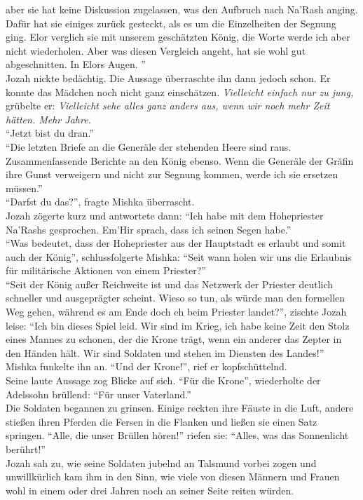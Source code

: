 aber sie hat keine Diskussion zugelassen, was den Aufbruch nach Na'Rash anging. Dafür hat sie 
einiges zurück gesteckt, als es um die Einzelheiten der Segnung ging. Elor verglich sie mit unserem 
geschätzten König, die Worte werde ich aber nicht wiederholen. Aber was diesen Vergleich angeht, 
hat sie wohl gut abgeschnitten. In Elors Augen. ''\\
Jozah nickte bedächtig. Die Aussage überraschte ihn dann jedoch schon. Er konnte das Mädchen noch 
nicht ganz einschätzen. \textit{Vielleicht einfach nur zu jung,} grübelte er: \textit{Vielleicht 
sehe alles ganz anders aus, wenn wir noch mehr Zeit hätten. Mehr Jahre.}\\
``Jetzt bist du dran.''\\
``Die letzten Briefe an die Generäle der stehenden Heere sind raus. Zusammenfassende Berichte an 
den König ebenso. Wenn die Generäle der Gräfin ihre Gunst verweigern und nicht zur Segnung kommen, 
werde ich sie ersetzen müssen.''\\
``Darfst du das?'', fragte Mishka überrascht.\\
Jozah zögerte kurz und antwortete dann: ``Ich habe mit dem Hohepriester Na'Rashs gesprochen. Em'Hir 
sprach, dass ich seinen Segen habe.''\\
``Was bedeutet, dass der Hohepriester aus der Hauptstadt es erlaubt und somit auch der König'', 
schlussfolgerte Mishka: ``Seit wann holen wir uns die Erlaubnis für militärische Aktionen von einem 
Priester?''\\
``Seit der König außer Reichweite ist und das Netzwerk der Priester deutlich schneller und 
ausgeprägter scheint. Wieso so tun, als würde man den formellen Weg gehen, während es am Ende doch 
eh beim Priester landet?'', zischte Jozah leise: ``Ich bin dieses Spiel leid. Wir sind im Krieg, 
ich habe keine Zeit den Stolz eines Mannes zu schonen, der die Krone trägt, wenn ein anderer das 
Zepter in den Händen hält. Wir sind Soldaten und stehen im Diensten des Landes!''\\
Mishka funkelte ihn an. ``Und der Krone!'', rief er kopfschüttelnd.\\
Seine laute Aussage zog Blicke auf sich. ``Für die Krone'', wiederholte der Adelssohn brüllend: 
``Für unser Vaterland.''\\
Die Soldaten begannen zu grinsen. Einige reckten ihre Fäuste in die Luft, andere stießen ihren 
Pferden die Fersen in die Flanken und ließen sie einen Satz springen. ``Alle, die 
unser Brüllen hören!'' riefen sie: ``Alles, was das Sonnenlicht berührt!''\\
Jozah sah zu, wie seine Soldaten jubelnd an Talsmund vorbei zogen und unwillkürlich kam ihm in den 
Sinn, wie viele von diesen Männern und Frauen wohl in einem oder drei Jahren noch an seiner Seite 
reiten würden.

